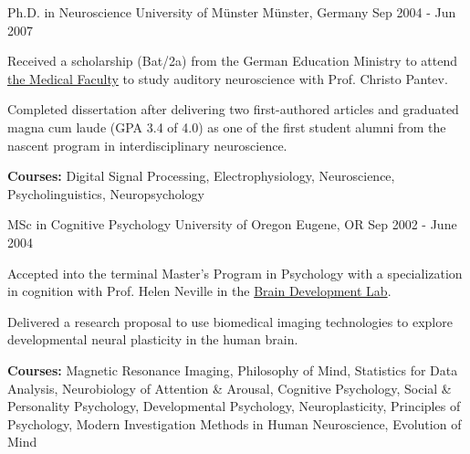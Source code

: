 

\begin{cventries}

  \cventry
    {Ph.D. in Neuroscience} %
    {University of Münster} %
    {Münster, Germany} %
    {Sep 2004 - Jun 2007} %
    {
      \begin{cvitems} %
        \item {Received a scholarship (Bat/2a) from the German Education Ministry to attend \href{https://www.medizin.uni-muenster.de/en/biomag/institut/ehemalige-alumni.html}{the Medical Faculty} to study auditory neuroscience with Prof. Christo Pantev.}
        \item {Completed dissertation after delivering two first-authored articles and graduated magna cum laude (GPA 3.4 of 4.0) as one of the first student alumni from the nascent program in interdisciplinary neuroscience.}
        \item {\textbf{Courses:} Digital Signal Processing, Electrophysiology, Neuroscience, Psycholinguistics, Neuropsychology}
      \end{cvitems}
    }
    
  \cventry
    {MSc in Cognitive Psychology} %
    {University of Oregon} %
    {Eugene, OR} %
    {Sep 2002 - June 2004} %
    {
      \begin{cvitems} %
        \item {Accepted into the terminal Master's Program in Psychology with a specialization in cognition with Prof. Helen Neville in the \href{https://bdl.uoregon.edu}{Brain Development Lab}.}
        \item {Delivered a research proposal to use biomedical imaging technologies to explore developmental neural plasticity in the human brain.}
        \item {\textbf{Courses:} Magnetic Resonance Imaging, Philosophy of Mind, Statistics for Data Analysis, Neurobiology of Attention \& Arousal, Cognitive Psychology,
        Social \& Personality Psychology, Developmental Psychology, Neuroplasticity, Principles of Psychology, Modern Investigation Methods in Human Neuroscience, Evolution of Mind}
      \end{cvitems}
    }
    

\end{cventries}
